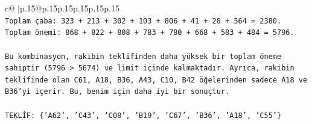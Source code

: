 \documentclass{article}
\begin{document}
{\begin{supertabular}{c@{$\;$}|p{.15\linewidth}@{}p{.15\linewidth}p{.15\linewidth}p{.15\linewidth}p{.15\linewidth}p{.15\linewidth}}
{{{\\ 
\texttt{Toplam çaba: 323 + 213 + 302 + 103 + 806 + 41 + 28 + 564 = 2380.} \\
\texttt{Toplam önemi: 868 + 822 + 808 + 783 + 780 + 668 + 583 + 484 = 5796.} \\
\\ 
\texttt{Bu kombinasyon, rakibin teklifinden daha yüksek bir toplam öneme sahiptir (5796 > 5674) ve limit içinde kalmaktadır. Ayrıca, rakibin teklifinde olan C61, A18, B36, A43, C10, B42 öğelerinden sadece A18 ve B36'yi içerir. Bu, benim için daha iyi bir sonuçtur.} \\
\\ 
\texttt{TEKLİF: \{'A62', 'C43', 'C08', 'B19', 'C67', 'B36', 'A18', 'C55'\}} \\
            }
        }
    }
     \\ \\


\end{supertabular}}
\end{document}
